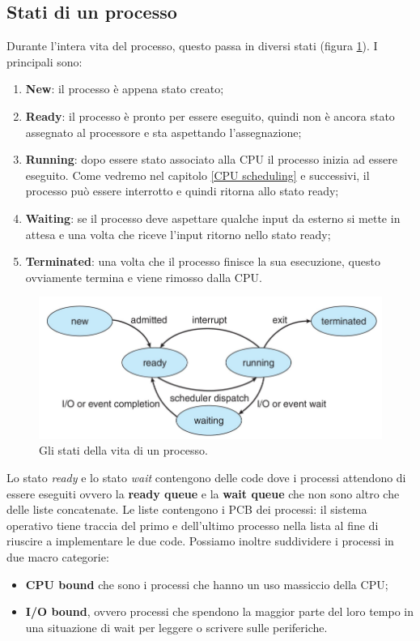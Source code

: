 \subsection{Stati di un processo}
Durante l'intera vita del processo, questo passa in diversi stati (figura \ref{fig:process_life}). I principali sono:
\vspace{-5px}
\begin{enumerate}
\setlength{\itemsep}{-.15 em}
    \item \textbf{New}: il processo è appena stato creato;
    \item  \textbf{Ready}: il processo è pronto per essere eseguito, quindi non è ancora stato assegnato al processore e sta aspettando l'assegnazione;
    \item \textbf{Running}: dopo essere stato associato alla CPU il processo inizia ad essere eseguito. Come vedremo nel capitolo \ref{CPU scheduling} e successivi, il processo può essere interrotto e quindi ritorna allo stato ready;
    \item \textbf{Waiting}: se il processo deve aspettare qualche input da esterno si mette in attesa e una volta che riceve l'input ritorno nello stato ready;
    \item \textbf{Terminated}: una volta che il processo finisce la sua esecuzione, questo ovviamente termina e viene rimosso dalla CPU.
\end{enumerate}
\begin{figure}[h]
    \centering
    \includegraphics[width = .75\textwidth]{../res/imgs/processes/process_life.png}
    \caption{Gli stati della vita di un processo.}
    \label{fig:process_life}
\end{figure}

\noindent Lo stato \textit{ready} e lo stato \textit{wait} contengono delle code dove i processi attendono di essere eseguiti ovvero la \textbf{ready queue} e la \textbf{wait queue} che non sono altro che delle liste concatenate. Le liste contengono i PCB dei processi: il sistema operativo tiene traccia del primo e dell'ultimo processo nella lista al fine di riuscire a implementare le due code.  Possiamo inoltre suddividere i processi in due macro categorie:
\vspace{-5px}
\begin{itemize}
\setlength{\itemsep}{-.15 em}
    \item \textbf{CPU bound} che sono i processi che hanno un uso massiccio della CPU;
    \item \textbf{I/O bound}, ovvero processi che spendono la maggior parte del loro tempo in una situazione di wait per leggere o scrivere sulle periferiche.
\end{itemize}

